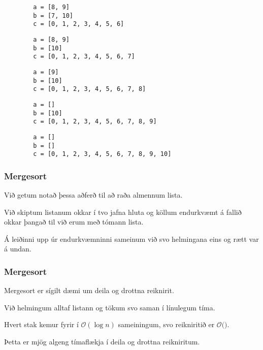 { \begin{verbatim}
        a = [8, 9]
        b = [7, 10]
        c = [0, 1, 2, 3, 4, 5, 6]
\end{verbatim} }

{ \begin{verbatim}
        a = [8, 9]
        b = [10]
        c = [0, 1, 2, 3, 4, 5, 6, 7]
\end{verbatim} }

{ \begin{verbatim}
        a = [9]
        b = [10]
        c = [0, 1, 2, 3, 4, 5, 6, 7, 8]
\end{verbatim} }

{ \begin{verbatim}
        a = []
        b = [10]
        c = [0, 1, 2, 3, 4, 5, 6, 7, 8, 9]
\end{verbatim} }

{ \begin{verbatim}
        a = []
        b = []
        c = [0, 1, 2, 3, 4, 5, 6, 7, 8, 9, 10]
\end{verbatim} }

{
     \mergeA
     \mergeB
     \mergeC
     \mergeD
     \mergeE
     \mergeF
     \mergeG
     \mergeH
     \mergeI
     \mergeJ
     \mergeK
     \mergeL
}

{
    \frametitle{Mergesort}
    {
        \item<1-> Við getum notað þessa aðferð til að raða almennum lista.
        \item<2-> Við skiptum listanum okkar í tvo jafna hluta og köllum endurkvæmt á fallið okkar þangað til við erum með tómann lista.
        \item<3-> Á leiðinni upp úr endurkvæmninni sameinum við svo helmingana eins og rætt var á undan.
    }
}

{
}

{
    \frametitle{Mergesort}
    {
        \item<1-> Mergesort er sígilt dæmi um deila og drottna reiknirit.
        \item<2-> Við helmingum alltaf listann og tökum svo saman í línulegum tíma.
        \item<3-> Hvert stak kemur fyrir í $\mathcal{O}(\log n)$ sameiningum, svo reikniritið er $\mathcal{O}($$)$.
        \item<5-> Þetta er mjög algeng tímaflækja í deila og drottna reikniritum.
    }
}

